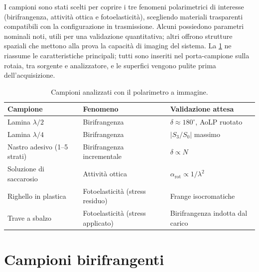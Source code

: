 
I campioni sono stati scelti per coprire i tre fenomeni polarimetrici di interesse (birifrangenza, attività ottica e fotoelasticità), scegliendo materiali trasparenti compatibili con la configurazione in trasmissione. Alcuni possiedono parametri nominali noti, utili per una validazione quantitativa; altri offrono strutture spaziali che mettono alla prova la capacità di imaging del sistema. La \cref{tab:campioni} ne riassume le caratteristiche principali; tutti sono inseriti nel porta-campione sulla rotaia, tra sorgente e analizzatore, e le superfici vengono pulite prima dell'acquisizione.

\begin{table}[H]
    \centering
    \caption{Campioni analizzati con il polarimetro a immagine.}
    \label{tab:campioni}
    \small
    \begin{tabularx}{\textwidth}{@{}l >{\raggedright\arraybackslash}X >{\raggedright\arraybackslash}X@{}}
        \hline
        \textbf{Campione} & \textbf{Fenomeno} & \textbf{Validazione attesa} \\
        \hline
        Lamina $\lambda/2$  & Birifrangenza & $\delta \approx 180^\circ$, AoLP ruotato \\
        Lamina $\lambda/4$ & Birifrangenza & $|S_3/S_0|$ massimo \\
        Nastro adesivo (1--5 strati) & Birifrangenza incrementale & $\delta \propto N$ \\
        Soluzione di saccarosio & Attività ottica & $\alpha_\text{rot} \propto 1/\lambda^2$ \\
        Righello in plastica & Fotoelasticità (stress residuo) & Frange isocromatiche \\
        Trave a sbalzo & Fotoelasticità (stress applicato) & Birifrangenza indotta dal carico \\ %
        \hline
    \end{tabularx}
\end{table}


\section{Campioni birifrangenti}
\label{sec:campioni-birifrangenti}

